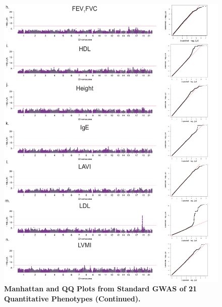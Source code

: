 \begin{figure}[!htb]
	\ContinuedFloat
	\centering
		\includegraphics[width=5in]{img/ch02/fig-s1b.pdf}
\caption[]{\textbf{Manhattan and QQ Plots from Standard GWAS of 21 Quantitative Phenotypes (Continued).} }
\label{fig:fig-s1b}
\end{figure}

